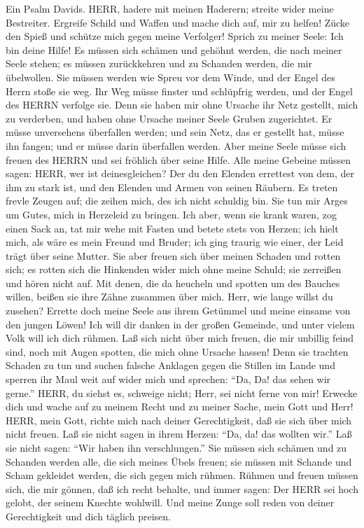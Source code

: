  Ein Psalm Davids. HERR, hadere mit meinen Haderern; streite
wider meine Bestreiter.  Ergreife Schild und Waffen und
mache dich auf, mir zu helfen!  Zücke den Spieß und schütze
mich gegen meine Verfolger! Sprich zu meiner Seele: Ich bin deine Hilfe!
 Es müssen sich schämen und gehöhnt werden, die nach meiner
Seele stehen; es müssen zurückkehren und zu Schanden werden, die mir
übelwollen.  Sie müssen werden wie Spreu vor dem Winde, und
der Engel des Herrn stoße sie weg.  Ihr Weg müsse finster
und schlüpfrig werden, und der Engel des HERRN verfolge sie.
 Denn sie haben mir ohne Ursache ihr Netz gestellt, mich zu
verderben, und haben ohne Ursache meiner Seele Gruben zugerichtet.
 Er müsse unversehens überfallen werden; und sein Netz, das
er gestellt hat, müsse ihn fangen; und er müsse darin überfallen werden.
 Aber meine Seele müsse sich freuen des HERRN und sei
fröhlich über seine Hilfe.  Alle meine Gebeine müssen
sagen: HERR, wer ist deinesgleichen? Der du den Elenden errettest von
dem, der ihm zu stark ist, und den Elenden und Armen von seinen Räubern.
 Es treten frevle Zeugen auf; die zeihen mich, des ich
nicht schuldig bin.  Sie tun mir Arges um Gutes, mich in
Herzeleid zu bringen.  Ich aber, wenn sie krank waren, zog
einen Sack an, tat mir wehe mit Fasten und betete stets von Herzen;
 ich hielt mich, als wäre es mein Freund und Bruder; ich
ging traurig wie einer, der Leid trägt über seine Mutter. 
Sie aber freuen sich über meinen Schaden und rotten sich; es rotten sich
die Hinkenden wider mich ohne meine Schuld; sie zerreißen und hören
nicht auf.  Mit denen, die da heucheln und spotten um des
Bauches willen, beißen sie ihre Zähne zusammen über mich. 
Herr, wie lange willst du zusehen? Errette doch meine Seele aus ihrem
Getümmel und meine einsame von den jungen Löwen!  Ich will
dir danken in der großen Gemeinde, und unter vielem Volk will ich dich
rühmen.  Laß sich nicht über mich freuen, die mir unbillig
feind sind, noch mit Augen spotten, die mich ohne Ursache hassen!
 Denn sie trachten Schaden zu tun und suchen falsche
Anklagen gegen die Stillen im Lande  und sperren ihr Maul
weit auf wider mich und sprechen: ``Da, Da! das sehen wir gerne.''
 HERR, du siehst es, schweige nicht; Herr, sei nicht ferne
von mir!  Erwecke dich und wache auf zu meinem Recht und zu
meiner Sache, mein Gott und Herr!  HERR, mein Gott, richte
mich nach deiner Gerechtigkeit, daß sie sich über mich nicht freuen.
 Laß sie nicht sagen in ihrem Herzen: ``Da, da! das wollten
wir.'' Laß sie nicht sagen: ``Wir haben ihn verschlungen.''
 Sie müssen sich schämen und zu Schanden werden alle, die
sich meines Übels freuen; sie müssen mit Schande und Scham gekleidet
werden, die sich gegen mich rühmen.  Rühmen und freuen
müssen sich, die mir gönnen, daß ich recht behalte, und immer sagen: Der
HERR sei hoch gelobt, der seinem Knechte wohlwill.  Und
meine Zunge soll reden von deiner Gerechtigkeit und dich täglich
preisen.

